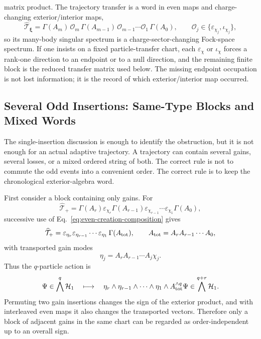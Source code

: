 \documentclass[aps,prb,onecolumn,nofootinbib,superscriptaddress]{revtex4-2}
\newcommand{\cH}{\mathcal{H}}
\newcommand{\cT}{\mathcal{T}}
\newcommand{\bxi}{{\boldsymbol{\xi}}}
\theoremstyle{plain}
\theoremstyle{definition}
\begin{document}
matrix product.  The trajectory transfer is a word in even maps and
charge-changing exterior/interior maps,
\begin{equation}
  \widehat{\cT}_\bxi
  =
  \Gamma(A_m)\,\mathcal O_m\,
  \Gamma(A_{m-1})\,\mathcal O_{m-1}\cdots
  \mathcal O_1\,\Gamma(A_0),
  \qquad
  \mathcal O_j\in\{\varepsilon_{\chi_j},\iota_{\chi_j}\},
  \label{eq:odd-even-transfer-word}
\end{equation}
so its many-body singular spectrum is a charge-sector-changing Fock-space
spectrum.  If one insists on a fixed particle-transfer chart, each
\(\varepsilon_\chi\) or \(\iota_\chi\) forces a rank-one direction to an
endpoint or to a null direction, and the remaining finite block is the
reduced transfer matrix used below.  The missing endpoint occupation is not
lost information; it is the record of which exterior/interior map occurred.

\subsection{Several Odd Insertions: Same-Type Blocks and Mixed Words}
\label{sec:several-odd-insertions}

The single-insertion discussion is enough to identify the obstruction, but it
is not enough for an actual adaptive trajectory.  A trajectory can contain
several gains, several losses, or a mixed ordered string of both.  The
correct rule is not to commute the odd events into a convenient order.  The
correct rule is to keep the chronological exterior-algebra word.

First consider a block containing only gains.  For
\begin{equation}
  \widehat{\cT}_{+}
  =
  \Gamma(A_r)\varepsilon_{\chi_r}
  \Gamma(A_{r-1})\varepsilon_{\chi_{r-1}}\cdots
  \varepsilon_{\chi_1}\Gamma(A_0),
  \label{eq:many-gain-word}
\end{equation}
successive use of Eq.~\eqref{eq:even-creation-composition} gives
\begin{equation}
  \widehat{\cT}_{+}
  =
  \varepsilon_{\eta_r}\varepsilon_{\eta_{r-1}}\cdots
  \varepsilon_{\eta_1}\,
  \Gamma(A_{\rm tot}),
  \qquad
  A_{\rm tot}=A_rA_{r-1}\cdots A_0,
  \label{eq:many-gain-normal-form}
\end{equation}
with transported gain modes
\begin{equation}
  \eta_j=A_rA_{r-1}\cdots A_j\chi_j .
  \label{eq:transported-gain-modes}
\end{equation}
Thus the \(q\)-particle action is
\begin{equation}
  \Psi\in\bigwedge^q\cH_1
  \quad\longmapsto\quad
  \eta_r\wedge\eta_{r-1}\wedge\cdots\wedge\eta_1
  \wedge A_{\rm tot}^{\wedge q}\Psi
  \in\bigwedge^{q+r}\cH_1 .
  \label{eq:many-gain-sector-map}
\end{equation}
Permuting two gain insertions changes the sign of the exterior product, and
with interleaved even maps it also changes the transported vectors.  Therefore
only a block of adjacent gains in the same chart can be regarded as
order-independent up to an overall sign.
\end{document}
